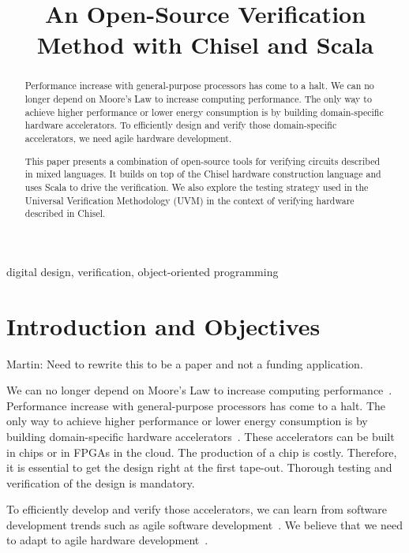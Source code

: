 \documentclass[conference]{IEEEtran}
\title{An Open-Source Verification Method with
Chisel and Scala}
\newcommand{\martin}[1]{{\color{blue} Martin: #1}}
\begin{document}
\maketitle \thispagestyle{empty}


\begin{abstract}
Performance increase with general-purpose processors has come to a halt.
We can no longer depend on Moore's Law to increase computing performance.
The only way to achieve higher performance or lower energy consumption
is by building domain-specific hardware accelerators.
To efficiently design and verify those domain-specific accelerators, we need
agile hardware development.

This paper presents a combination of open-source tools for verifying
circuits described in mixed languages. It builds on top of the Chisel
hardware construction language and uses Scala to drive the verification. 
We also explore the testing strategy used in the Universal Verification Methodology
(UVM) in the context of verifying hardware described in Chisel.
\end{abstract}

\begin{IEEEkeywords}
digital design, verification, object-oriented programming
\end{IEEEkeywords}

\section{Introduction and Objectives}
\label{sec:objectives}

\martin{Need to rewrite this to be a paper and not a funding application.}

We can no longer depend on Moore's Law to increase computing performance~\cite{dark-silicon:2011}.
Performance increase with general-purpose processors has come to a halt.
The only way to achieve higher performance or lower energy consumption
is by building domain-specific hardware accelerators~\cite{domain-hw-acc:2020}.
These accelerators can be built in chips or in FPGAs in the cloud.
The production of a chip is costly. Therefore, it is essential to get
the design right at the first tape-out. Thorough testing and verification of the design is mandatory.

To efficiently develop and verify those accelerators, we can learn from software development trends such as agile software development~\cite{agile:manifesto}.
We believe that we need to adapt to agile hardware development~\cite{henn-patt:turing:2019}.
\end{document}
